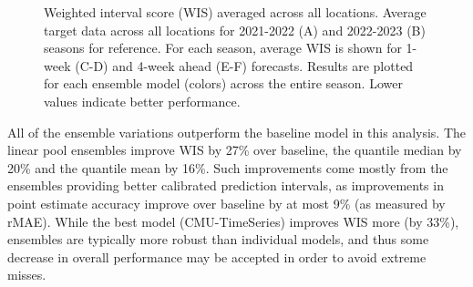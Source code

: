 \documentclass[
]{article}
\begin{document}
\begin{figure}


\caption{\label{fig-wis-vs-forecast-date}Weighted interval score (WIS)
averaged across all locations. Average target data across all locations
for 2021-2022 (A) and 2022-2023 (B) seasons for reference. For each
season, average WIS is shown for 1-week (C-D) and 4-week ahead (E-F)
forecasts. Results are plotted for each ensemble model (colors) across
the entire season. Lower values indicate better performance.}

\end{figure}%

All of the ensemble variations outperform the baseline model in this
analysis. The linear pool ensembles improve WIS by 27\% over baseline,
the quantile median by 20\% and the quantile mean by 16\%. Such
improvements come mostly from the ensembles providing better calibrated
prediction intervals, as improvements in point estimate accuracy improve
over baseline by at most 9\% (as measured by rMAE). While the best model
(CMU-TimeSeries) improves WIS more (by 33\%), ensembles are typically
more robust than individual models, and thus some decrease in overall
performance may be accepted in order to avoid extreme misses.
\end{document}
